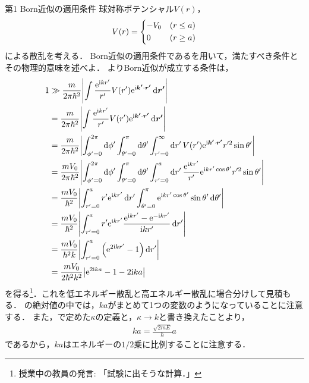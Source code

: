 \documentclass{report}
\begin{document}
  \begin{myex}{第1 Born近似の適用条件}{}
    球対称ポテンシャル$V(r)$，
    \begin{align}
      V(r) = \begin{dcases}
        -V_0 &(r \leq a)\\
        0 &(r \geq a)
      \end{dcases}
    \end{align}
    による散乱を考える．
    Born近似の適用条件であるを用いて，満たすべき条件とその物理的意味を述べよ．
    \tcblower
    よりBorn近似が成立する条件は，
    \begin{align}
      1 &\gg \frac{m}{2\pi \hbar^2}\abs{\int \frac{\mathrm{e}^{\mathrm{i} kr'}}{r'}V(r')\mathrm{e}^{\mathrm{i}\bm{k '}\cdot\bm{r'}}\dd{\bm{r'}}} \\
      &= \frac{m}{2\pi \hbar^2}\abs{\int \frac{\mathrm{e}^{\mathrm{i} kr'}}{r'}V(r')\mathrm{e}^{\mathrm{i}\bm{k'}\cdot\bm{r'}}\dd{\bm{r'}}} \\
      &= \frac{m}{2\pi \hbar^2}\abs{\int_{\phi' = 0}^{2\pi}\dd{\phi'}\int_{\theta' = 0}^{\pi}\dd{\theta'}\int_{r' = 0}^{\infty}\dd{r'}V(r')\mathrm{e}^{\mathrm{i}\bm{k'}\cdot\bm{r'}}r'^2\sin\theta'} \\ 
      &= \frac{mV_0}{2\pi \hbar^2}\abs{\int_{\phi' = 0}^{2\pi}\dd{\phi'}\int_{\theta' = 0}^{\pi}\dd{\theta'}\int_{r' = 0}^{a}\dd{r'} \frac{\mathrm{e}^{\mathrm{i} kr'}}{r'}\mathrm{e}^{\mathrm{i} kr'\cos\theta'}r'^2\sin\theta'} \\ 
      &= \frac{mV_0}{\hbar^2}\abs{\int_{r' = 0}^{a}r'\mathrm{e}^{\mathrm{i} kr'}\dd{r'}\int_{\theta' = 0}^{\pi}\mathrm{e}^{\mathrm{i} kr'\cos\theta'}\sin\theta'\dd{\theta'}} \\
      &= \frac{mV_0}{\hbar^2}\abs{\int_{r' = 0}^{a}r'\mathrm{e}^{\mathrm{i} kr'}\frac{\mathrm{e}^{\mathrm{i} kr'} - \mathrm{e}^{-\mathrm{i} kr'}}{\mathrm{i} kr'}\dd{r'}} \\
      &= \frac{mV_0}{\hbar^2k}\abs{\int_{r' = 0}^{a}\qty(\mathrm{e}^{2\mathrm{i} kr'} - 1)\dd{r'}} \\
      &= \frac{mV_0}{2\hbar^2 k^2}\abs{\mathrm{e}^{2\mathrm{i} ka} - 1 - 2\mathrm{i} ka}\label{born-limit-ball}
    \end{align}
    を得る\footnote{授業中の教員の発言: 「試験に出そうな計算．」}．これを低エネルギー散乱と高エネルギー散乱に場合分けして見積もる．
    の絶対値の中では，$ka$がまとめて1つの変数のようになっていることに注意する．
    また，で定めた$\kappa$の定義と，$\kappa \to k$と書き換えたことより，
    \begin{align}
      ka = \frac{\sqrt{2mE}}{\hbar}a
    \end{align}
    であるから，$ka$はエネルギーの$1/2$乗に比例することに注意する．

\end{myex}
\end{document}
